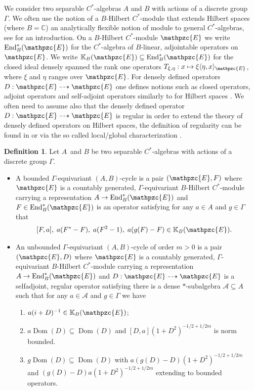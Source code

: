 \documentclass[a4paper,reqno]{amsart}
\numberwithin{equation}{section}
\def\End{\operatorname{End}}
\def\Dom{\operatorname{Dom}}
\def\C{\mathbb{C}}
\theoremstyle{definition}
\newtheorem{definition}[thm]{Definition}
\theoremstyle{remark}
\begin{document}
We consider two separable $C^*$-algebras $A$ and $B$ with actions of a discrete group $\Gamma$. We often use the notion of a $B$-Hilbert $C^*$-module that extends Hilbert spaces (where $B=\C$) an analytically flexible notion of module to general $C^*$-algebras, see \cite{lancebook} for an introduction. On a $B$-Hilbert $C^*$-module $\mathpzc{E}$ we write $\End_B^*(\mathpzc{E})$ for the $C^*$-algebra of $B$-linear, adjointable operators on $\mathpzc{E}$. We write $\mathbb{K}_B(\mathpzc{E})\subseteq \End_B^*(\mathpzc{E})$ for the closed ideal densely spanned the rank one operators $T_{\xi,\eta}:x\mapsto \xi\langle \eta,x\rangle_{\mathpzc{E}}$, where $\xi$ and $\eta$ ranges over $\mathpzc{E}$. For densely defined operators $D:\mathpzc{E}\dashrightarrow \mathpzc{E}$ one defines notions such as closed operators, adjoint operators and self-adjoint operators similarly to for Hilbert spaces \cite{lancebook}. We often need to assume also that the densely defined operator $D:\mathpzc{E}\dashrightarrow \mathpzc{E}$ is regular in order to extend the theory of densely defined operators on Hilbert spaces, the definition of regularity can be found in \cite{lancebook} or via the so called local/global characterization \cite{leschkaadlocal}. 




\begin{definition} 
\label{adljnadjlknad}
Let $A$ and $B$ be two separable $C^*$-algebras with actions of a discrete group $\Gamma$. 
\begin{itemize}
\item A bounded $\Gamma$-equivariant $(A,B)$-cycle is a pair $(\mathpzc{E},F)$ where $\mathpzc{E}$ is a countably generated, $\Gamma$-equivariant $B$-Hilbert $C^*$-module carrying a representation $A\to \End_B^*(\mathpzc{E})$ and $F\in \End_B^*(\mathpzc{E})$ is an operator satisfying for any $a\in A$ and $g\in \Gamma$ that
$$[F,a], \; a(F^*-F), \;a(F^2-1), \; a(g(F)-F)\in \mathbb{K}_B(\mathpzc{E}).$$
\item An unbounded $\Gamma$-equivariant $(A,B)$-cycle of order $m>0$ is a pair $(\mathpzc{E},D)$ where $\mathpzc{E}$ is a countably generated, $\Gamma$-equivariant $B$-Hilbert $C^*$-module carrying a representation $A\to \End_B^*(\mathpzc{E})$ and $D:\mathpzc{E}\dashrightarrow \mathpzc{E}$ is a selfadjoint, regular operator satisfying there is a dense $*$-subalgebra $\mathcal{A}\subseteq A$ such that for any $a\in \mathcal{A}$ and $g\in \Gamma$ we have
\begin{enumerate}
\item $a(i+D)^{-1}\in \mathbb{K}_B(\mathpzc{E})$;
\item $a\Dom(D)\subseteq \Dom(D)$ and $[D,a](1+D^2)^{-1/2+1/2m}$ is norm bounded.
\item $g\Dom(D)\subseteq \Dom(D)$ with $a(g(D)-D)(1+D^2)^{-1/2+1/2m}$ and $(g(D)-D)a(1+D^2)^{-1/2+1/2m}$ extending to bounded operators.
\end{enumerate}
\end{itemize}
\end{definition}
\end{document}
